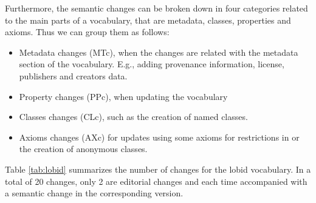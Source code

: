 Furthermore, the semantic changes can be broken down in four categories related to the main parts of a vocabulary, that are metadata, classes, properties and axioms. Thus we can group them as follows:

\begin{itemize}
\item Metadata changes (MTc), when the changes are related with the metadata section of the vocabulary. E.g., adding provenance information, license, publishers and creators data.
\item Property changes (PPc), when updating the vocabulary 
\item Classes changes (CLc), such as the creation of named classes.
\item Axioms changes (AXc) for updates using some axioms for restrictions in or the creation of anonymous classes. 

\end{itemize}

Table \ref{tab:lobid} summarizes the number of changes for the lobid vocabulary. In  a total of 20 changes, only 2 are editorial changes and each time accompanied with a semantic change in the corresponding version.

\begin{table}[!htb]
\end{table}


  


